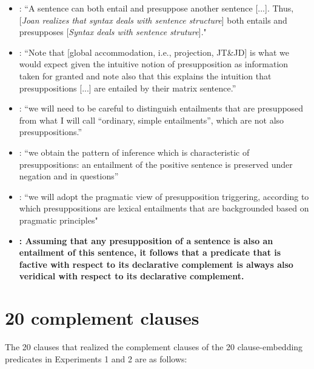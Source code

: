 \documentclass[11pt,fleqn]{article}
\newcommand{\6}{\mbox{$[\hspace*{-.6mm}[$}}
\newcommand{\9}{\mbox{$]\hspace*{-.6mm}]$}}
\begin{document}
{\begin{itemize}[topsep=0pt,itemsep=-3pt,leftmargin=12pt]
\item \citealt[355]{ccmg90}: ``A sentence can both entail and presuppose another sentence [...]. Thus, [{\em Joan realizes that syntax deals with sentence structure}] both entails and presupposes [{\em Syntax deals with sentence struture}]."

\item \citealt[345]{vds92}: ``Note that [global accommodation, i.e., projection, JT\&JD] is what we would expect given the intuitive notion of presupposition as information taken for granted and note also that this explains the intuition that presuppositions [...] are entailed by their matrix sentence.''

\item \citealt[3]{abbott06}: ``we will need to be careful to distinguish entailments that are presupposed from what I will call ``ordinary, simple entailments'', which are not also presuppositions.''

\item \citealt[139]{schlenker10}: ``we obtain the pattern of inference which is characteristic of presuppositions: an entailment of the positive sentence is preserved under negation and in questions''


\item \citealt[77]{anand-hacquard2014}: ``we will adopt the pragmatic view of presupposition triggering, according to which presuppositions are lexical entailments that are backgrounded based on pragmatic principles"

\item {\bf \citealt[fn.7]{spector-egre2015}: Assuming that any presupposition of a sentence is also an entailment of this sentence, it follows that a predicate that is factive with respect to its declarative complement is always also veridical with respect to its declarative complement.}

\end{itemize}

\section{20 complement clauses}\label{a-clauses}

The 20  clauses that realized the complement clauses of the 20 clause-embedding predicates in Experiments 1 and 2 are as follows:

\begin{enumerate}[leftmargin=3ex,itemsep=-2pt]

\begin{multicols}{2}


\end{multicols}
\end{enumerate}}
\end{document}
